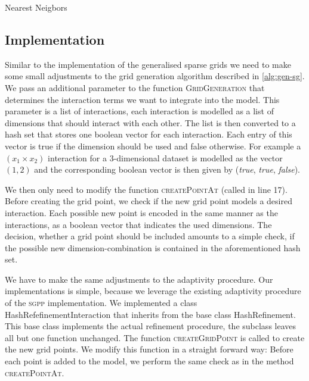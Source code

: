 \begin{algorithm}[h]
  \caption{Nearest Neigbors}\label{alg:neigbors}
  \begin{algorithmic}[1]
    \Statex
       
      \State{}
      \EndIf
      \EndFor
    \State{}
    \EndFor
    \State{}
    \EndFunction
  \end{algorithmic}
\end{algorithm}

\subsection{Implementation}
Similar to the implementation of the generalised sparse grids we need to
make some small adjustments to the grid generation algorithm described in \cref{alg:gen-sg}.
We pass an additional parameter to the function \textsc{GridGeneration} that determines the interaction terms we want to integrate into the model.
This parameter is a list of interactions, each interaction is modelled as a list of dimensions that should interact with each other.
The list is then converted to a hash set that stores one boolean vector for each interaction.
Each entry of this vector is true if the dimension should be used and false otherwise.
For example a \((x_1 \times x_2)\) interaction for a 3-dimensional dataset is
modelled as the vector \((1, 2)\) and the corresponding boolean vector is then given by (\emph{true}, \emph{true}, \emph{false}).

We then only need to modify the function \textsc{createPointAt} (called in line 17).
Before creating the grid point, we check if the new grid point models a desired
interaction.
Each possible new point is encoded in the same manner as the interactions, as a
boolean vector that indicates the used dimensions.
The decision, whether a grid point should be included amounts to a simple check,
if the possible new dimension-combination is contained in the aforementioned
hash set.

We have to make the same adjustments to the adaptivity procedure.
Our implementations is simple, because we leverage the existing adaptivity
procedure of the \textsc{sgpp} implementation.
We implemented a class HashRefefinementInteraction that inherits from the base
class HashRefinement.
This base class implements the actual refinement procedure, the subclass leaves
all but one function unchanged.
The function \textsc{createGridPoint} is called to create the new grid points.
We modify this function in a straight forward way:
Before each point is added to the model, we perform the same check as in the
method \textsc{createPointAt}.

